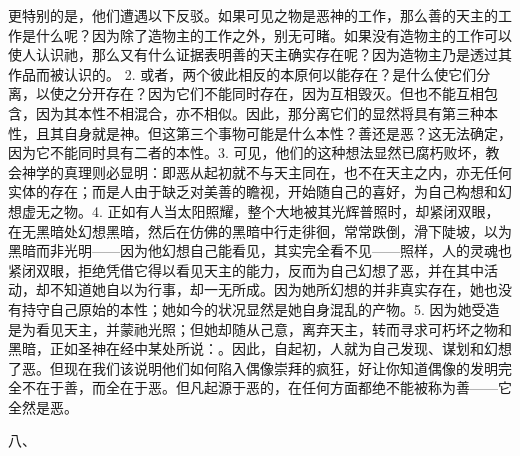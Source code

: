 更特别的是，他们遭遇以下反驳。如果可见之物是恶神的工作，那么善的天主的工作是什么呢？因为除了造物主的工作之外，别无可睹。如果没有造物主的工作可以使人认识祂，那么又有什么证据表明善的天主确实存在呢？因为造物主乃是透过其作品而被认识的。 2. 或者，两个彼此相反的本原何以能存在？是什么使它们分离，以使之分开存在？因为它们不能同时存在，因为互相毁灭。但也不能互相包含，因为其本性不相混合，亦不相似。因此，那分离它们的显然将具有第三种本性，且其自身就是神。但这第三个事物可能是什么本性？善还是恶？这无法确定，因为它不能同时具有二者的本性。3. 可见，他们的这种想法显然已腐朽败坏，教会神学的真理则必显明：即恶从起初就不与天主同在，也不在天主之内，亦无任何实体的存在；而是人由于缺乏对美善的瞻视，开始随自己的喜好，为自己构想和幻想虚无之物。4. 正如有人当太阳照耀，整个大地被其光辉普照时，却紧闭双眼，在无黑暗处幻想黑暗，然后在仿佛的黑暗中行走徘徊，常常跌倒，滑下陡坡，以为黑暗而非光明——因为他幻想自己能看见，其实完全看不见——照样，人的灵魂也紧闭双眼，拒绝凭借它得以看见天主的能力，反而为自己幻想了恶，并在其中活动，却不知道她自以为行事，却一无所成。因为她所幻想的并非真实存在，她也没有持守自己原始的本性；她如今的状况显然是她自身混乱的产物。5. 因为她受造是为看见天主，并蒙祂光照；但她却随从己意，离弃天主，转而寻求可朽坏之物和黑暗，正如圣神在经中某处所说：。因此，自起初，人就为自己发现、谋划和幻想了恶。但现在我们该说明他们如何陷入偶像崇拜的疯狂，好让你知道偶像的发明完全不在于善，而全在于恶。但凡起源于恶的，在任何方面都绝不能被称为善——它全然是恶。\par

八、\par

